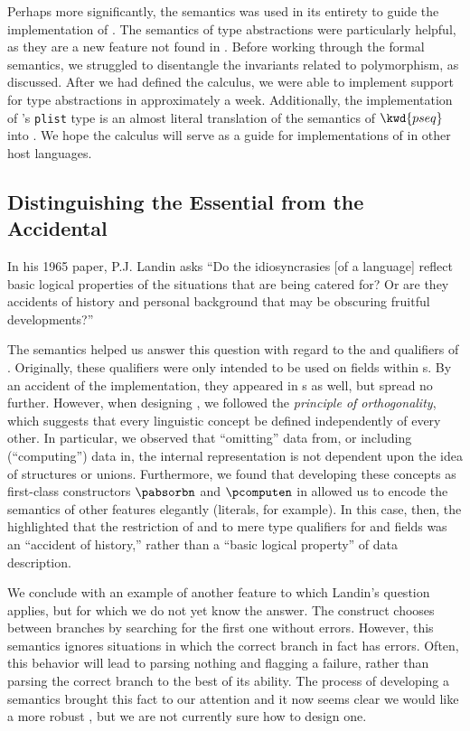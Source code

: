 Perhaps more significantly, the semantics was used in its entirety to guide the implementation of \padsml{}. The semantics of type abstractions were particularly helpful, as they are a new feature not found in \padsc{}. Before working through the formal semantics, we struggled to disentangle the invariants related to polymorphism, as discussed. After we had defined the calculus, we were able to implement support for type abstractions in approximately a week.  Additionally, the implementation of \padsml{}'s \texttt{plist} type is an almost literal translation of the semantics of $\kwd{pseq}$ into \ocaml{}.
We hope the calculus will serve as a guide for implementations of \pads{} in other host languages.

\subsection{Distinguishing the Essential from the Accidental}

In his 1965 paper, P.J. Landin asks ``Do the idiosyncrasies [of a
language] reflect basic logical properties of the situations that are
being catered for?  Or are they accidents of history and personal
background that may be obscuring fruitful developments?''  

The semantics helped us answer this question with regard to the
\Pomit{} and \Pcompute{} qualifiers of \padsc{}.  Originally, these
qualifiers were only intended to be used on fields within \Pstruct{}s.
By an accident of the implementation, they appeared in \Punion{}s as
well, but spread no further. However, when designing \ddc{}, we
followed the {\em principle of orthogonality}, which suggests that
every linguistic concept be defined independently of every other.  In
particular, we observed that ``omitting'' data from, or including
(``computing'') data in, the internal representation is not dependent
upon the idea of structures or unions.  Furthermore, we found that
developing these concepts as first-class constructors $\pabsorbn$ and
$\pcomputen$ in \ddc{} allowed us to encode the semantics of other
\padsc{} features elegantly (literals, for example).  In this case, then, the
\ddc{} highlighted that the restriction of \Pomit{} and \Pcompute{} to
mere type qualifiers for \Punion{} and \Pstruct{} fields was an
``accident of history,'' rather than a ``basic logical property'' of
data description.

We conclude with an example of another feature to which Landin's
question applies, but for which we do not yet know the answer. The \Punion{}
construct chooses between branches by searching for the first one
without errors. However, this semantics ignores situations in which
the correct branch in fact has errors. Often, this behavior will lead
to parsing nothing and flagging a failure, rather than parsing the
correct branch to the best of its ability.  The process of
developing a semantics brought this fact to our attention and
it now seems clear we would like a more robust
\Punion, but we are not currently sure how to design one. 

